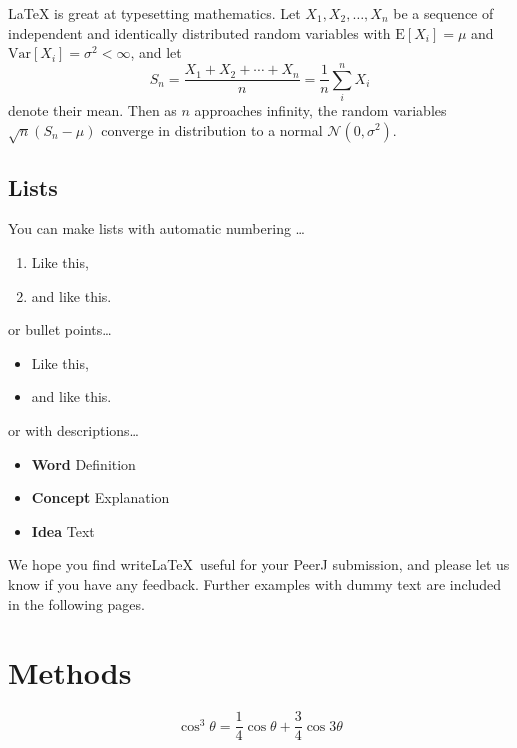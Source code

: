\documentclass[fleqn,10pt,lineno]{wlpeerj} %
\providecommand{\tightlist}{
\setlength{\itemsep}{0pt}\setlength{\parskip}{0pt}}
\begin{document}
\LaTeX{} is great at typesetting mathematics. Let
\(X_1, X_2, \ldots, X_n\) be a sequence of independent and identically
distributed random variables with \(\text{E}[X_i] = \mu\) and
\(\text{Var}[X_i] = \sigma^2 < \infty\), and let
\[S_n = \frac{X_1 + X_2 + \cdots + X_n}{n}
      = \frac{1}{n}\sum_{i}^{n} X_i\] denote their mean. Then as \(n\)
approaches infinity, the random variables \(\sqrt{n}(S_n - \mu)\)
converge in distribution to a normal \(\mathcal{N}(0, \sigma^2)\).

\subsection*{Lists}\label{lists}

You can make lists with automatic numbering \dots

\begin{enumerate}
\def\labelenumi{\arabic{enumi}.}
\tightlist
\item
  Like this,
\item
  and like this.
\end{enumerate}

or bullet points\ldots{}

\begin{itemize}
\tightlist
\item
  Like this,
\item
  and like this.
\end{itemize}

or with descriptions\ldots{}

\begin{itemize}
\tightlist
\item
  \textbf{Word} Definition
\item
  \textbf{Concept} Explanation
\item
  \textbf{Idea} Text
\end{itemize}

We hope you find write\LaTeX~useful for your PeerJ submission, and
please let us know if you have any feedback. Further examples with dummy
text are included in the following pages.

\section*{Methods}\label{methods}

\lipsum[4] 

\begin{equation}
\cos^3 \theta =\frac{1}{4}\cos\theta+\frac{3}{4}\cos 3\theta
\label{eq:refname2}
\end{equation}
\end{document}
